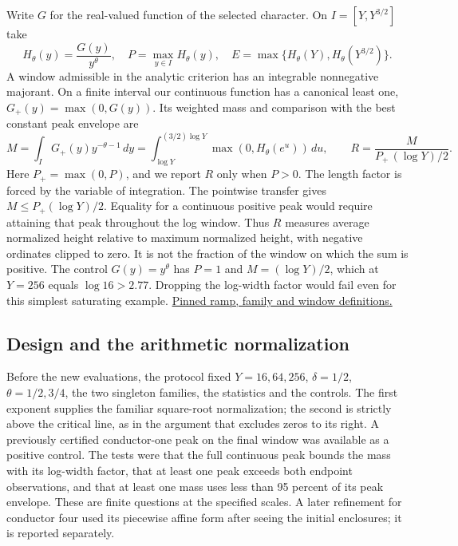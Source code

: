 \documentclass[12pt,letterpaper]{article}
\begin{document}
Write \(G\) for the real-valued function of the selected character. On \(I=[Y,Y^{3/2}]\) take
\[
 H_\theta(y)=\frac{G(y)}{y^\theta},\quad
 P=\max_{y\in I}H_\theta(y),\quad
 E=\max\{H_\theta(Y),H_\theta(Y^{3/2})\}.
\]
A window admissible in the analytic criterion has an integrable nonnegative majorant. On a finite interval our continuous function has a canonical least one, \(G_+(y)=\max(0,G(y))\). Its weighted mass and comparison with the best constant peak envelope are
\[
 M=\int_I G_+(y)y^{-\theta-1}\,dy
   =\int_{\log Y}^{(3/2)\log Y}\max(0,H_\theta(e^u))\,du,
 \qquad
 R=\frac{M}{P_+\,(\log Y)/2}.
\]
Here \(P_+=\max(0,P)\), and we report \(R\) only when \(P>0\). The length factor is forced by the variable of integration. The pointwise transfer gives \(M\le P_+(\log Y)/2\). Equality for a continuous positive peak would require attaining that peak throughout the log window. Thus \(R\) measures average normalized height relative to maximum normalized height, with negative ordinates clipped to zero. It is not the fraction of the window on which the sum is positive. The control \(G(y)=y^\theta\) has \(P=1\) and \(M=(\log Y)/2\), which at \(Y=256\) equals \(\log16>2.77\). Dropping the log-width factor would fail even for this simplest saturating example.
\href{https://github.com/nousentllc/riemann-hypothesis/blob/40e56bab026552e089d7afcfeff08d2defb9c005/src/Development/AutomorphicArithmetic/DedekindLFunctions/CharFamily.lean\#L10-L45}{Pinned ramp, family and window definitions.}

\subsection{Design and the arithmetic normalization}
Before the new evaluations, the protocol fixed \(Y=16,64,256\), \(\delta=1/2\), \(\theta=1/2,3/4\), the two singleton families, the statistics and the controls. The first exponent supplies the familiar square-root normalization; the second is strictly above the critical line, as in the argument that excludes zeros to its right. A previously certified conductor-one peak on the final window was available as a positive control. The tests were that the full continuous peak bounds the mass with its log-width factor, that at least one peak exceeds both endpoint observations, and that at least one mass uses less than 95 percent of its peak envelope. These are finite questions at the specified scales. A later refinement for conductor four used its piecewise affine form after seeing the initial enclosures; it is reported separately.
\end{document}
